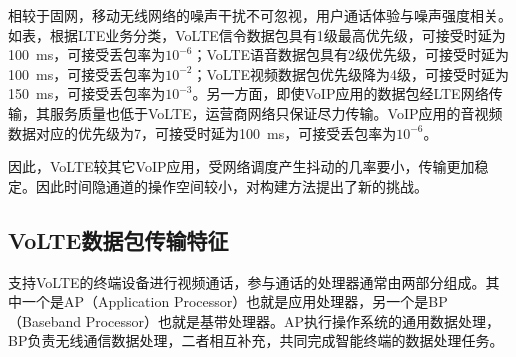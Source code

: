 
相较于固网，移动无线网络的噪声干扰不可忽视，用户通话体验与噪声强度相关。如表，根据LTE业务分类，VoLTE信令数据包具有1级最高优先级，可接受时延为{100\ ms}，可接受丢包率为$10^{-6}$；VoLTE语音数据包具有2级优先级，可接受时延为{100\ ms}，可接受丢包率为$10^{-2}$；VoLTE视频数据包优先级降为4级，可接受时延为{150\ ms}，可接受丢包率为$10^{-3}$。另一方面，即使VoIP应用的数据包经LTE网络传输，其服务质量也低于VoLTE，运营商网络只保证尽力传输。VoIP应用的音视频数据对应的优先级为7，可接受时延为{100\ ms}，可接受丢包率为$10^{-6}$。

因此，VoLTE较其它VoIP应用，受网络调度产生抖动的几率要小，传输更加稳定。因此时间隐通道的操作空间较小，对构建方法提出了新的挑战。

\subsection{VoLTE数据包传输特征}
\label{chap:backinfo:volte:packets}
支持VoLTE的终端设备进行视频通话，参与通话的处理器通常由两部分组成。其中一个是AP（Application Processor）也就是应用处理器，另一个是BP（Baseband Processor）也就是基带处理器。AP执行操作系统的通用数据处理，BP负责无线通信数据处理，二者相互补充，共同完成智能终端的数据处理任务。

